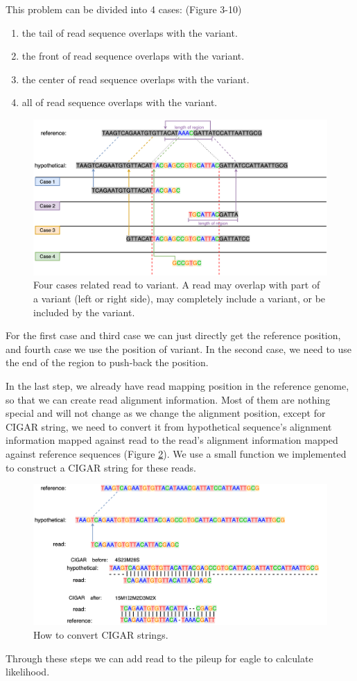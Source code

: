 \noindent
This problem can be divided into 4 cases: (Figure 3-10)
\begin{enumerate}
\itemsep=-0.5em
\item the tail of read sequence overlaps with the variant.
\item the front of read sequence overlaps with the variant.
\item the center of read sequence overlaps with the variant.
\item all of read sequence overlaps with the variant.
\end{enumerate}

\begin{figure}[ht]
\centering
\includegraphics[width=1\columnwidth]{body/image/3-10.png}
\caption[alignment read]{Four cases related read to variant.  A read may overlap with part of a variant (left or right side), may completely include a variant, or be included by the variant.}
\label{f3-10}
\end{figure}


For the first case and third case we can just directly get the reference position, and fourth case we use the position of variant.  In the second case, we need to use the end of the region to push-back the position.

In the last step, we already have read mapping position in the reference genome, so that we can create read alignment information. Most of them are nothing special and will not change as we change the alignment position, except for CIGAR string, we need to convert it from hypothetical sequence's alignment information mapped against read to the read's alignment information mapped against reference sequences (Figure \ref{f3-11}).  We use a small function we implemented to construct a CIGAR string for these reads.

\begin{figure}[H]
\includegraphics[width=1\columnwidth]{body/image/3-11.png}
\caption[CIGAR strings]{How to convert CIGAR strings.}
\label{f3-11}
\end{figure}

Through these steps we can add read to the pileup for eagle to calculate likelihood.
